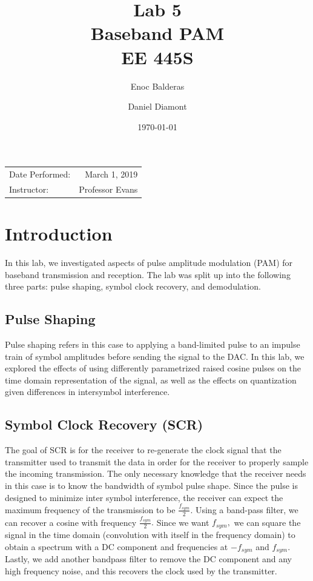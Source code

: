 \documentclass{article}
\title{Lab 5\\ Baseband PAM\\ EE 445S} %
\author{Enoc Balderas\\
        \and
        Daniel Diamont\\} %
\date{\today} %
\begin{document}
\maketitle %

\begin{center}
\begin{tabular}{l r}
Date Performed: & March 1, 2019 \\ %
Instructor: & Professor Evans %
\end{tabular}
\end{center}



\section{Introduction}

In this lab, we investigated aspects of pulse amplitude modulation (PAM) for baseband transmission and reception. The lab was split up into the following three parts: pulse shaping, symbol clock recovery, and demodulation.

\subsection{Pulse Shaping}
Pulse shaping refers in this case to applying a band-limited pulse to an impulse train of symbol amplitudes before sending the signal to the DAC. In this lab, we explored the effects of using differently parametrized raised cosine pulses on the time domain representation of the signal, as well as the effects on quantization given differences in intersymbol interference.

\subsection{Symbol Clock Recovery (SCR)}
The goal of SCR is for the receiver to re-generate the clock signal that the transmitter used to transmit the data in order for the receiver to properly sample the incoming transmission. The only necessary knowledge that the receiver needs in this case is to know the bandwidth of symbol pulse shape. Since the pulse is designed to minimize inter symbol interference, the receiver can expect the maximum frequency of the transmission to be $ \frac{f_{sym}}{2}. $ Using a band-pass filter, we can recover a cosine with frequency $ \frac{f_{sym}}{2}. $ Since we want $ f_{sym}, $ we can square the signal in the time domain (convolution with itself in the frequency domain) to obtain a spectrum with a DC component and frequencies at $ - f_{sym} $ and $ f_{sym}.$ Lastly, we add another bandpass filter to remove the DC component and any high frequency noise, and this recovers the clock used by the transmitter.
\end{document}
